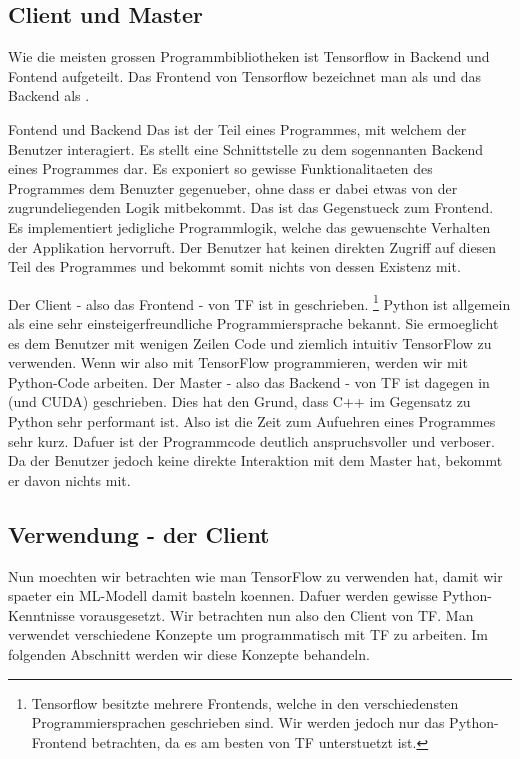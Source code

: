 \para{}
\cite{book:tensorflow}

\subsection{Client und Master}
Wie die meisten grossen Programmbibliotheken ist Tensorflow in Backend und
Fontend aufgeteilt. Das Frontend von Tensorflow bezeichnet man als
 und das Backend als .
\para{}
\begin{infobox}{Fontend und Backend}
  Das  ist der Teil eines Programmes, mit welchem der Benutzer
  interagiert. Es stellt eine Schnittstelle zu dem sogennanten Backend eines
  Programmes dar. Es exponiert so gewisse Funktionalitaeten des Programmes dem
  Benuzter gegenueber, ohne dass er dabei etwas von der zugrundeliegenden Logik mitbekommt.
  \para{}
  Das  ist das Gegenstueck zum Frontend. Es implementiert
  jedigliche Programmlogik, welche das gewuenschte Verhalten der Applikation
  hervorruft. Der Benutzer hat keinen direkten Zugriff auf diesen Teil des
  Programmes und bekommt somit nichts von dessen Existenz mit.
\end{infobox}
\para{}
Der Client - also das Frontend - von TF ist in  geschrieben.
\footnote{
  Tensorflow besitzte mehrere Frontends, welche in den verschiedensten
  Programmiersprachen geschrieben sind. Wir werden jedoch nur das
  Python-Frontend betrachten, da es am besten von TF unterstuetzt ist.
}
Python ist allgemein als eine sehr einsteigerfreundliche Programmiersprache bekannt. Sie
ermoeglicht es dem Benutzer mit wenigen Zeilen Code und ziemlich intuitiv
TensorFlow zu verwenden. Wenn wir also mit TensorFlow programmieren, werden wir
mit Python-Code arbeiten.
\para{}
Der Master - also das Backend - von TF ist dagegen in  (und CUDA)
geschrieben. Dies hat den Grund, dass C++ im Gegensatz zu Python sehr performant
ist. Also ist die Zeit zum Aufuehren eines Programmes sehr kurz. Dafuer ist der
Programmcode deutlich anspruchsvoller und verboser. Da der Benutzer jedoch keine
direkte Interaktion mit dem Master hat, bekommt er davon nichts mit.

\subsection{Verwendung - der Client}
Nun moechten wir betrachten wie man TensorFlow zu verwenden hat, damit wir
spaeter ein ML-Modell damit basteln koennen. Dafuer werden gewisse
Python-Kenntnisse vorausgesetzt. Wir betrachten nun also
den Client von TF. Man verwendet verschiedene Konzepte um
programmatisch mit TF zu arbeiten. Im folgenden Abschnitt werden wir diese
Konzepte behandeln.

